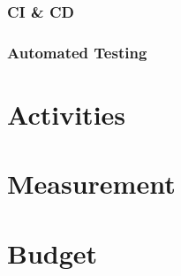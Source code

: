 \documentclass[12pt, letterpaper]{article}
\begin{document}
		\subsubsection{CI \& CD}
		\subsubsection{Automated Testing}
		

\newpage

\section{Activities}

\newpage

\section{Measurement}

\newpage

\section{Budget}
\end{document}
